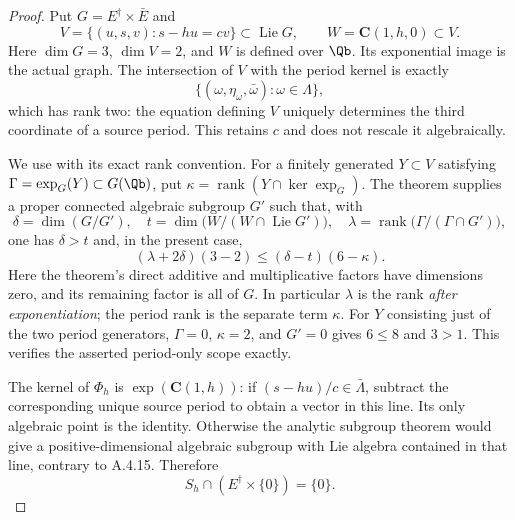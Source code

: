 \begin{proof}
Put $G=E^\dagger\times\bar E$ and
\[
 V=\{(u,s,v):s-hu=cv\}\subset\operatorname{Lie}G,\qquad
 W=\mathbf C(1,h,0)\subset V.
\]
Here $\dim G=3$, $\dim V=2$, and $W$ is defined over $\Qb$.
Its exponential image is the actual graph. The intersection of
$V$ with the period kernel is exactly
\[
 \{(\omega,\eta_\omega,\bar\omega):\omega\in\Lambda\},
\]
which has rank two: the equation defining $V$ uniquely determines
the third coordinate of a source period. This retains $c$ and does
not rescale it algebraically.

We use \cite[Theorem 4.1, pp.385--386]{EllWaldschmidt1988Subgroup}
with its exact rank convention. For a finitely generated
$Y\subset V$ satisfying $\Gamma=\exp_G(Y)\subset G(\Qb)$, put
$\kappa=\operatorname{rank}(Y\cap\ker\exp_G)$. The theorem supplies
a proper connected algebraic subgroup $G'$ such that, with
\[
 \delta=\dim(G/G'),\quad
 t=\dim\bigl(W/(W\cap\operatorname{Lie}G')\bigr),\quad
 \lambda=\operatorname{rank}\bigl(\Gamma/(\Gamma\cap G')\bigr),
\]
one has $\delta>t$ and, in the present case,
\[
 (\lambda+2\delta)(3-2)\le(\delta-t)(6-\kappa).
\]
Here the theorem's direct additive and multiplicative factors have
dimensions zero, and its remaining factor is all of $G$.
In particular $\lambda$ is the rank \emph{after exponentiation};
the period rank is the separate term $\kappa$.
For $Y$ consisting just of the two period generators,
$\Gamma=0$, $\kappa=2$, and $G'=0$ gives $6\le8$ and $3>1$.
This verifies the asserted period-only scope exactly.

The kernel of $\Phi_h$ is $\exp(\mathbf C(1,h))$:
if $(s-hu)/c\in\bar\Lambda$, subtract the corresponding unique
source period to obtain a vector in this line. Its only algebraic
point is the identity. Otherwise the analytic subgroup theorem
\cite[Hauptsatz and Bemerkung 2, printed p.3]{EllWustholz1984}
would give a positive-dimensional algebraic subgroup with Lie
algebra contained in that line, contrary to A.4.15.
Therefore
\begin{equation}\label{ell:graph-kernel-algebraic}
 S_h\cap(E^\dagger\times\{0\})=\{0\}.
\end{equation}


\end{proof}
